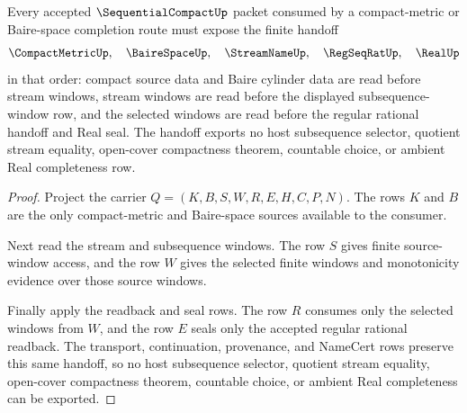 \begin{theorem}
\label{thm:sequential-compact-finite-subsequence-handoff}
Every accepted $\SequentialCompactUp$ packet consumed by a compact-metric or Baire-space completion route must expose the finite handoff
$$
\CompactMetricUp,\quad \BaireSpaceUp,\quad \StreamNameUp,\quad \RegSeqRatUp,\quad \RealUp
$$
in that order: compact source data and Baire cylinder data are read before stream windows, stream windows are read before the displayed subsequence-window row, and the selected windows are read before the regular rational handoff and Real seal. The handoff exports no host subsequence selector, quotient stream equality, open-cover compactness theorem, countable choice, or ambient Real completeness row.
\end{theorem}
\begin{proof}
Project the carrier $Q=(K,B,S,W,R,E,H,C,P,N)$. The rows $K$ and $B$ are the only compact-metric and Baire-space sources available to the consumer.

Next read the stream and subsequence windows. The row $S$ gives finite source-window access, and the row $W$ gives the selected finite windows and monotonicity evidence over those source windows.

Finally apply the readback and seal rows. The row $R$ consumes only the selected windows from $W$, and the row $E$ seals only the accepted regular rational readback. The transport, continuation, provenance, and NameCert rows preserve this same handoff, so no host subsequence selector, quotient stream equality, open-cover compactness theorem, countable choice, or ambient Real completeness can be exported.
\end{proof}

